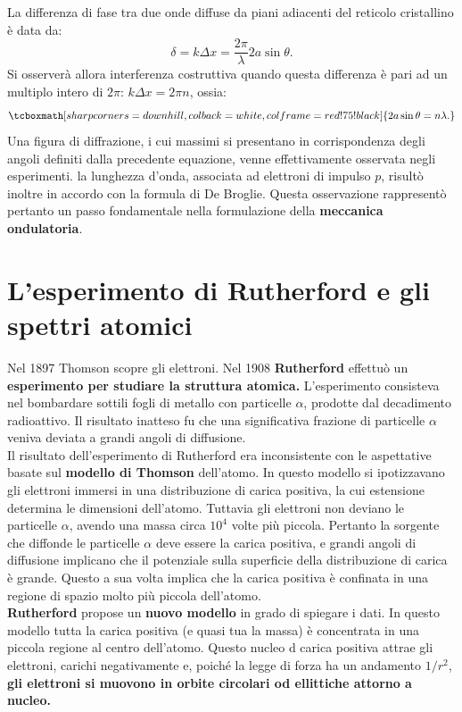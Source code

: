 \documentclass[a4paper,12pt,oneside]{book}
\begin{document}
\newpage
La differenza di fase tra due onde diffuse  da piani adiacenti del reticolo cristallino è data da:
	\begin{equation}
		\delta = k \Delta x = \frac{2 \pi}{\lambda} 2a \sin \theta.
	\end{equation}
Si osserverà allora interferenza costruttiva quando questa differenza è pari ad un multiplo intero di $2 \pi$: $k \Delta x = 2 \pi n$, ossia:
	\begin{equation}
		\tcboxmath[sharp corners=downhill ,colback=white,colframe=red!75!black]{
			2a \sin \theta = n\lambda.
			}
	\end{equation}
Una figura di diffrazione, i cui massimi si presentano in corrispondenza degli angoli definiti dalla precedente equazione, venne effettivamente osservata negli esperimenti. la lunghezza d'onda, associata ad elettroni di impulso $p$, risultò inoltre in accordo con la formula di De Broglie. Questa osservazione rappresentò pertanto un passo fondamentale nella formulazione della \textbf{meccanica ondulatoria}.
\section{L'esperimento di Rutherford e gli spettri atomici}
Nel 1897 Thomson scopre gli elettroni. Nel 1908 \textbf{Rutherford} effettuò un \textbf{esperimento per studiare la struttura atomica.} L'esperimento consisteva nel bombardare sottili fogli di metallo con particelle $\alpha$, prodotte dal decadimento radioattivo. Il risultato inatteso fu che una significativa frazione di particelle $\alpha$ veniva deviata a grandi angoli di diffusione.\\

Il risultato dell'esperimento di Rutherford era inconsistente con le aspettative basate sul \textbf{modello di Thomson} dell'atomo. In questo modello si ipotizzavano gli elettroni immersi in una distribuzione di carica positiva, la cui estensione determina le dimensioni dell'atomo. Tuttavia gli elettroni non deviano le particelle $\alpha$, avendo una massa circa $10^4$ volte più piccola. Pertanto la sorgente che diffonde le particelle $\alpha$ deve essere la carica positiva, e grandi angoli di diffusione implicano che il potenziale sulla superficie della distribuzione di carica è grande. Questo a sua volta implica che la carica positiva è confinata in una regione di spazio molto più piccola dell'atomo.\\

\textbf{Rutherford} propose un \textbf{nuovo modello} in grado di spiegare i dati. In questo modello tutta la carica positiva (e quasi tua la massa) è concentrata in una piccola regione al centro dell'atomo. Questo nucleo d carica positiva attrae gli elettroni, carichi negativamente e, poiché la legge di forza ha un andamento $1/r^2$, \textbf{gli elettroni si muovono in orbite circolari od ellittiche attorno a nucleo.}\\
\end{document}
